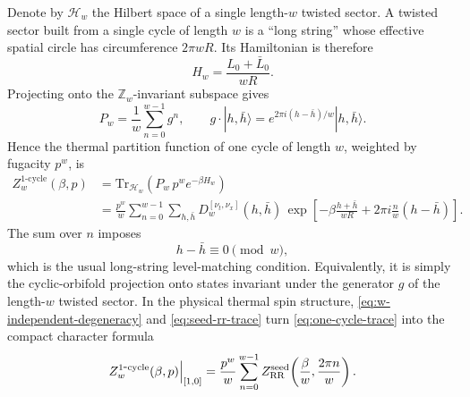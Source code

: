 \documentclass[11pt]{article}
\newcommand{\mc}[1]{\mathcal{#1}}
\begin{document}
Denote by $\mc H_w$ the Hilbert space of a single length-$w$ twisted sector. A twisted sector built from a single cycle of length $w$ is a ``long string'' whose effective spatial circle has circumference $2\pi wR$. Its Hamiltonian is therefore
\begin{equation}\label{eq:long-string-hamiltonian}
H_w=\frac{L_0+\bar L_0}{wR}.
\end{equation}
Projecting onto the $\mathbb Z_w$-invariant subspace gives
\begin{equation}\label{eq:cyclic-projector}
P_w=\frac{1}{w}\sum_{n=0}^{w-1} g^n,
\qquad
g\cdot |h,\bar h\rangle
=
e^{2\pi i(h-\bar h)/w}|h,\bar h\rangle.
\end{equation}
Hence the thermal partition function of one cycle of length $w$, weighted by fugacity $p^w$, is
\begin{equation}\label{eq:one-cycle-trace}
\begin{aligned}
Z^{\mathrm{1\mbox{-}cycle}}_w(\beta,p)
&=
\mathrm{Tr}_{\mc H_w}\!\left(
P_w\,p^w e^{-\beta H_w}
\right)
\\
&=
\frac{p^w}{w}\sum_{n=0}^{w-1}\sum_{h,\bar h}D_w^{[\nu_t,\nu_x]}(h,\bar h)\,
\exp\!\left[
-\beta \frac{h+\bar h}{wR}
+2\pi i \frac{n}{w}(h-\bar h)
\right].
\end{aligned}
\end{equation}
The sum over $n$ imposes
\begin{equation}\label{eq:orbifold-level-matching}
h-\bar h\equiv 0 \pmod w,
\end{equation}
which is the usual long-string level-matching condition. Equivalently, it is simply the cyclic-orbifold projection onto states invariant under the generator $g$ of the length-$w$ twisted sector.
In the physical thermal spin structure, \eqref{eq:w-independent-degeneracy} and \eqref{eq:seed-rr-trace} turn \eqref{eq:one-cycle-trace} into the compact character formula
\begin{equation}\label{eq:one-cycle-trace-thermal}
Z^{\mathrm{1\mbox{-}cycle}}_w(\beta,p)\Big|_{[1,0]}
=
\frac{p^w}{w}\sum_{n=0}^{w-1}
Z_{\rm RR}^{\mathrm{seed}}\!\left(\frac{\beta}{w},\frac{2\pi n}{w}\right).
\end{equation}
\end{document}
